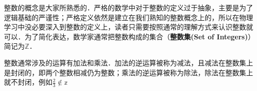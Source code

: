 
整数的概念是大家所熟悉的．严格的数学中对于整数的定义过于抽象，主要是为了逻辑基础的严谨性；严格定义依然是建立在我们熟知的整数概念上的，所以在物理学习中没必要深入到整数的定义上，读者只需要按照通常的理解方式来认识整数就可以．为了简化表达，数学家通常把整数构成的集合（\textbf{整数集(Set of Integers)}）简记为$\mathbb{Z}$．

整数通常涉及的运算有加法和乘法．加法的逆运算被称为减法，且减法在整数集上是封闭的，即两个整数相减仍为整数；乘法的逆运算被称为除法，除法在整数集上就不封闭，例如$\frac{2}{3}\not\in\mathbb{z}$